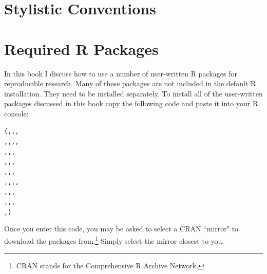 \documentclass[krantz1]{krantz}
\begin{document}
\chapter*{Stylistic Conventions}\label{StylisticConventions}









\chapter*{Required R Packages} \label{ReqPackages}

In this book I discuss how to use a number of user-written R packages for reproducible research. Many of these packages are not included in the default R installation. They need to be installed separately. To install all of the user-written packages discussed in this book copy the following code and paste it into your R console:

\begin{knitrout}
\color{fgcolor}\begin{kframe}
\begin{alltt}
(, , ,
                , , , , 
                , , , 
                , , , 
                , , ,
                , , , ,
                , , ,
                , , ,                 
                , )
\end{alltt}
\end{kframe}
\end{knitrout}


\noindent Once you enter this code, you may be asked to select a CRAN ``mirror" to download the packages from.\footnote{CRAN stands for the Comprehensive R Archive Network.} Simply select the mirror closest to you.
\end{document}
